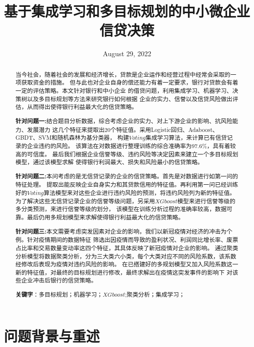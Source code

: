 \documentclass[UTF8]{ctexart}
\title{基于集成学习和多目标规划的中小微企业信贷决策}
\date{August 29, 2022}
\begin{document}
		\maketitle{}
		\renewcommand{\abstractname}{\Large 摘要\\}
		\begin{abstract}
			\normalsize
			当今社会，随着社会的发展和经济增长，贷款是企业运作和经营过程中经常会采取的一项获取资金的措施。
			但与此也对企业自身的偿还能力有着一定要求，银行对贷款会有着一定的评估策略。本文针对银行和中小企业
			的借贷问题，利用集成学习、机器学习、决策树以及多目标规划等方法来研究银行如何根据
			企业的实力、信誉以及信贷风险做出评估，从而得出使得银行利益最大化的信贷策略。

			\textbf{针对问题一:}结合题目分析数据，综合考虑企业的实力、对上下游企业的影响、抗风险能力、发展潜力
			这几个特征来提取出20个特征值。采用Logistic回归、Adaboost、GBDT、SVM和随机森林为基分类器，
			构建$Voting$集成学习算法，来计算已有信贷记录的企业违约的风险。
			该算法在对数据进行整理训练的综合准确率为97.6$\%$，具有着较高的可信度。
			最后我们根据企业信誉等级、违约风险等决定因素来建立一个多目标规划模型，通过该模型求解
			使得银行利润最大、损失和风险最小的信贷策略。
			
			\textbf{针对问题二:}本问考虑的是无信贷记录的企业的信贷策略。首先是对数据进行如第一问的特征处理。
			提取出能反映企业自身实力和其贷款信用的特征值。再利用第一问已经训练好的$Voting$算法模型来对这些企业进行违约风险的预测，将违约风险列为新的特征值。
			为了解决这些无信贷记录企业的信誉等级问题，另采用$XGboost$模型来进行信誉等级的多分类预测，来进行信誉等级的划分，
			该模型在训练分析过程的准确率较高，数据可靠。最后仍用多规划模型来求解使得银行利益最大化的信贷策略。

			\textbf{针对问题三:}本文需要考虑突发因素对企业的影响，我们以新冠疫情对经济的冲击为个例。针对疫情期间的数据特征
			筛选出因疫情而导致的盈利状况、利润同比增长率、废票占比率和交易数量变动率这四个特征，其具体反映了新冠疫情对企业的影响。
			通过聚类分析模型将数据聚类分析，分为三大类六小类，每个大类对应不同的风险系数，该系数经修改后表现为疫情对违约风险的影响。
			在已搭建好的多规划模型又加入风险系数这一新的特征值，对最终的目标规划进行修改，最终求解出在疫情这突发事件的影响下
			对该些企业冲击后银行的信贷策略。

			\vspace{5em}
			\textbf{关键字}：多目标规划；机器学习；$XGboost$;聚类分析；集成学习；
		
		\end{abstract}
		\newpage
		
		\section{问题背景与重述}
\end{document}
